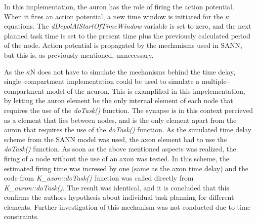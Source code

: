 		In this implementation, the auron has the role of firing the action potential.
		When it fires an action potential, a new time window is initiated for the $\kappa$ equations.
		The \emph{dDepolAtStartOfTimeWindow} variable is set to zero, and the next planned task time is set to the present time plus the previously calculated period of the node.
		Action potential is propagated by the mechanisms used in SANN, but this is, as previously mentioned, unnecessary. 
		
%

		As the $\kappa$N does not have to simulate the mechanisms behind the time delay, single--compartment implementation could be used to simulate a multiple--compartment model of the neuron.
		This is examplified in this impelementation, by letting the auron element be the only internal element of each node that requires the use of the \emph{doTask()} function.
		The synapse is in this context percieved as a element that lies between nodes, and is the only element apart from the auron that requires the use of the \emph{doTask()} function. %
		As the simulated time delay scheme from the SANN model was used, the axon element had to use the \emph{doTask()} function.
		As soon as the above mentioned aspects was realized, the firing of a node without the use of an axon was tested.
		In this scheme, the estimated firing time was incresed by one (same as the axon time delay) and the code from \emph{K\_axon::doTask()} function was called directly from \emph{K\_auron::doTask()}.
		The result was identical, and it is concluded that this confirms the authors hypothesis about individual task planning for different elements.
		Further investigation of this mechanism was not conducted due to time constraints.
		
